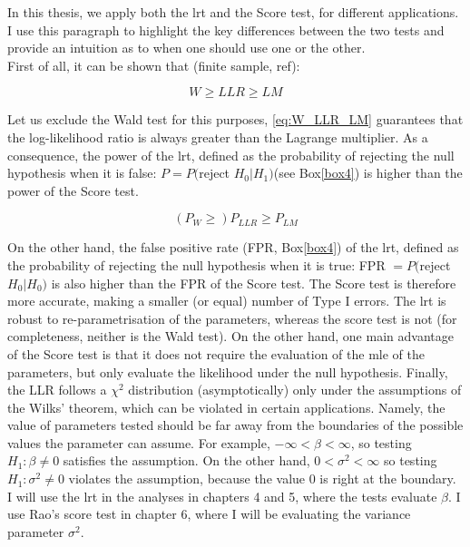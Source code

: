 In this thesis, we apply both the \gls{lrt} and the Score test, for different applications.
I use this paragraph to highlight the key differences between the two tests and provide an intuition as to when one should use one or the other.\\

First of all, it can be shown that (finite sample, ref):

\begin{equation}\label{eq:W_LLR_LM}
    W \geq LLR \geq LM
\end{equation}

Let us exclude the Wald test for this purposes, \eqref{eq:W_LLR_LM} guarantees that the log-likelihood ratio is always greater than the Lagrange multiplier.
As a consequence, the power  of the \gls{lrt}, defined as the probability of rejecting the null hypothesis when it is false: $P = P($reject $H_0 | H_1)$(see Box\ref{box4}) is higher than the power of the Score test.

\begin{equation}
    (P_W \geq) P_{LLR} \geq P_{LM}
\end{equation}

On the other hand, the false positive rate (FPR, Box\ref{box4}) of the \gls{lrt}, defined as the probability of rejecting the null hypothesis when it is true: FPR $= P($reject $H_0 | H_0)$ is also higher than the FPR of the Score test.
The Score test is therefore more accurate, making a smaller (or equal) number of Type I errors. The \gls{lrt} is robust to re-parametrisation of the parameters, whereas the score test is not (for completeness, neither is the Wald test). On the other hand, one main advantage of the Score test is that it does not require the evaluation of the \gls{mle} of the parameters, but only evaluate the likelihood under the null hypothesis.
Finally, the LLR follows a $\chi^2$ distribution (asymptotically) only under the assumptions of the Wilks' theorem, which can be violated in certain applications.
Namely, the value of parameters tested should be far away from the boundaries of the possible values the parameter can assume.
For example, $-\infty < \beta < \infty$, so testing $H_1: \beta \neq 0$ satisfies the assumption.
On the other hand, $0 < \sigma^2 < \infty$ so testing $H_1: \sigma^2 \neq 0$ violates the assumption, because the value $0$ is right at the boundary.\\

I will use the \gls{lrt} in the analyses in chapters 4 and 5, where the tests evaluate $\beta$.
I use Rao's score test in chapter 6, where I will be evaluating the variance parameter $\sigma^2$.


